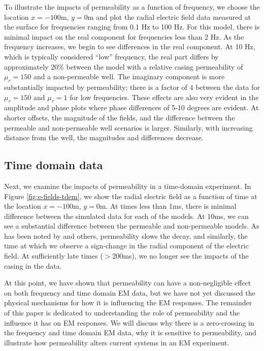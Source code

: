 \documentclass[onecolumn, extra, mreferee]{gji}
\begin{document}


To illustrate the impacts of permeability as a function of frequency, we choose the location $x=-100$m, $y=0$m and plot the radial electric field data measured at the surface for frequencies ranging from 0.1 Hz to 100 Hz. For this model, there is minimal impact on the real component for frequencies less than 2 Hz. As the frequency increases, we begin to see differences in the real component. At 10 Hz, which is typically considered ``low'' frequency, the real part differs by approximately 20\% between the model with a relative casing permeability of $\mu_r=150$ and a non-permeable well. The imaginary component is more substantially impacted by permeability; there is a factor of 4 between the data for $\mu_r=150$ and $\mu_r=1$ for low frequencies. These effects are also very evident in the amplitude and phase plots where phase differences of 5-10 degrees are evident. At shorter offsets, the magnitude of the fields, and the difference between the permeable and non-permeable well scenarios is larger. Similarly, with increasing distance from the well, the magnitudes and differences decrease.



\subsection{Time domain data}
Next, we examine the impacts of permeability in a time-domain experiment. In Figure \ref{fig:e-fields-tdem}, we show the radial electric field as a function of time at the location $x=-100$m, $y=0$m.  At times less than 1ms, there is minimal difference between the simulated data for each of the models. At 10ms, we can see a substantial difference between the permeable and non-permeable models. As has been noted by \citep{Pavlov2001} and others, permeability slows the decay, and similarly, the time at which we observe a sign-change in the radial component of the electric field. At sufficiently late times ($>$200ms), we no longer see the impacts of the casing in the data.




\bigskip

At this point, we have shown that permeability can have a non-negligible effect on both frequency and time domain EM data, but we have not yet discussed the physical mechanisms for how it is influencing the EM responses. The remainder of this paper is dedicated to understanding the role of permeability and the influence it has on EM responses. We will discuss why there is a zero-crossing in the frequency and time domain EM data, why it is sensitive to permeability, and illustrate how permeability alters current systems in an EM experiment.
\end{document}

